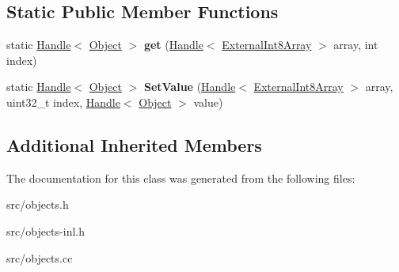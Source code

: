 \subsection*{Static Public Member Functions}
\begin{DoxyCompactItemize}
\item 
\hypertarget{classv8_1_1internal_1_1_external_int8_array_aeb294a7b0b963dba59b4cd7687e7cb5a}{}static \hyperlink{classv8_1_1internal_1_1_handle}{Handle}$<$ \hyperlink{classv8_1_1internal_1_1_object}{Object} $>$ {\bfseries get} (\hyperlink{classv8_1_1internal_1_1_handle}{Handle}$<$ \hyperlink{classv8_1_1internal_1_1_external_int8_array}{External\+Int8\+Array} $>$ array, int index)\label{classv8_1_1internal_1_1_external_int8_array_aeb294a7b0b963dba59b4cd7687e7cb5a}

\item 
\hypertarget{classv8_1_1internal_1_1_external_int8_array_a7348f2f3b35ebe636f29cf5737a1fde2}{}static \hyperlink{classv8_1_1internal_1_1_handle}{Handle}$<$ \hyperlink{classv8_1_1internal_1_1_object}{Object} $>$ {\bfseries Set\+Value} (\hyperlink{classv8_1_1internal_1_1_handle}{Handle}$<$ \hyperlink{classv8_1_1internal_1_1_external_int8_array}{External\+Int8\+Array} $>$ array, uint32\+\_\+t index, \hyperlink{classv8_1_1internal_1_1_handle}{Handle}$<$ \hyperlink{classv8_1_1internal_1_1_object}{Object} $>$ value)\label{classv8_1_1internal_1_1_external_int8_array_a7348f2f3b35ebe636f29cf5737a1fde2}

\end{DoxyCompactItemize}
\subsection*{Additional Inherited Members}


The documentation for this class was generated from the following files\+:\begin{DoxyCompactItemize}
\item 
src/objects.\+h\item 
src/objects-\/inl.\+h\item 
src/objects.\+cc\end{DoxyCompactItemize}
